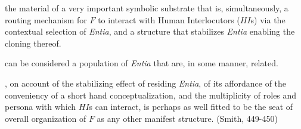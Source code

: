 




 the material of a very important symbolic
substrate that is, simultaneously, a routing mechanism for $F$ to interact with
Human Interlocutors ($HI$s) via the contextual selection of \textit{Entia}, and
a structure that stabilizes \textit{Entia} enabling the cloning thereof.

 can be considered a population of \textit{Entia} that
are, in some manner, related.

, on account of the stabilizing effect of residing
\textit{Entia}, of its affordance of the conveniency of a short hand
conceptualization, and the multiplicity of roles and persona with which $HI$s
can interact, is perhaps as well fitted to be the seat of overall organization
of $F$ as any other manifest structure. (Smith, 449-450)


